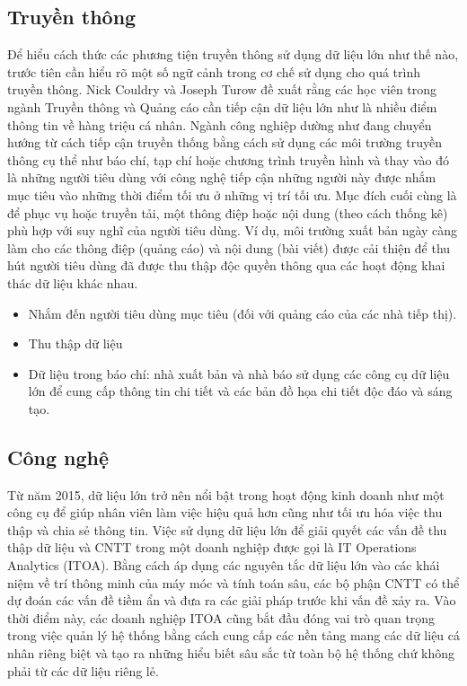 \documentclass[12pt,a4paper]{report}
\begin{document}
\subsection{Truyền thông}
Để hiểu cách thức các phương tiện truyền thông sử dụng dữ liệu lớn như thế nào, trước tiên cần hiểu rõ một số ngữ cảnh trong cơ chế sử dụng cho quá trình truyền thông. Nick Couldry và Joseph Turow đề xuất rằng các học viên trong ngành Truyền thông và Quảng cáo cần tiếp cận dữ liệu lớn như là nhiều điểm thông tin về hàng triệu cá nhân. Ngành công nghiệp dường như đang chuyển hướng từ cách tiếp cận truyền thống bằng cách sử dụng các môi trường truyền thông cụ thể như báo chí, tạp chí hoặc chương trình truyền hình và thay vào đó là những người tiêu dùng với công nghệ tiếp cận những người này được nhắm mục tiêu vào những thời điểm tối ưu ở những vị trí tối ưu. Mục đích cuối cùng là để phục vụ hoặc truyền tải, một thông điệp hoặc nội dung (theo cách thống kê) phù hợp với suy nghĩ của người tiêu dùng. Ví dụ, môi trường xuất bản ngày càng làm cho các thông điệp (quảng cáo) và nội dung (bài viết) được cải thiện để thu hút người tiêu dùng đã được thu thập độc quyền thông qua các hoạt động khai thác dữ liệu khác nhau.
\begin{itemize}
	\item Nhắm đến người tiêu dùng mục tiêu (đối với quảng cáo của các nhà tiếp thị).
	\item Thu thập dữ liệu
	\item Dữ liệu trong báo chí: nhà xuất bản và nhà báo sử dụng các công cụ dữ liệu lớn để cung cấp thông tin chi tiết và các bản đồ họa chi tiết độc đáo và sáng tạo.
\end{itemize}
\subsection{Công nghệ}
Từ năm 2015, dữ liệu lớn trở nên nổi bật trong hoạt động kinh doanh như một công cụ để giúp nhân viên làm việc hiệu quả hơn cũng như tối ưu hóa việc thu thập và chia sẻ thông tin. Việc sử dụng dữ liệu lớn để giải quyết các vấn đề thu thập dữ liệu và CNTT trong một doanh nghiệp được gọi là IT Operations Analytics (ITOA). Bằng cách áp dụng các nguyên tắc dữ liệu lớn vào các khái niệm về trí thông minh của máy móc và tính toán sâu, các bộ phận CNTT có thể dự đoán các vấn đề tiềm ẩn và đưa ra các giải pháp trước khi vấn đề xảy ra. Vào thời điểm này, các doanh nghiệp ITOA cũng bắt đầu đóng vai trò quan trọng trong việc quản lý hệ thống bằng cách cung cấp các nền tảng mang các dữ liệu cá nhân riêng biệt và tạo ra những hiểu biết sâu sắc từ toàn bộ hệ thống chứ không phải từ các dữ liệu riêng lẻ.
\end{document}
